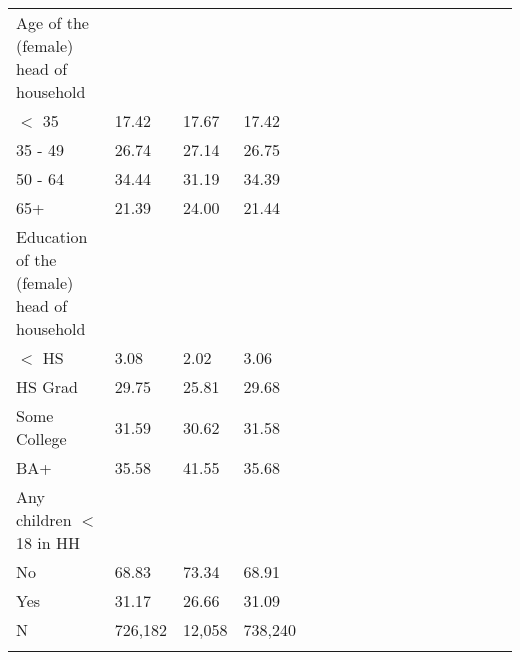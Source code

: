 \begin{center}
\begin{tabularx} {14cm} {@{} l Y Y Y Y Y Y Y Y Y Y Y Y Y Y Y Y@{}}
\midrule
Age of the (female) head of household&&& \\
$<$ 35&17.42&17.67&17.42 \\
35 - 49&26.74&27.14&26.75 \\
50 - 64&34.44&31.19&34.39 \\
65+&21.39&24.00&21.44 \\
\midrule
Education of the (female) head of household&&& \\
$<$ HS&3.08&2.02&3.06 \\
HS Grad&29.75&25.81&29.68 \\
Some College&31.59&30.62&31.58 \\
BA+&35.58&41.55&35.68 \\
\midrule
Any children $<$ 18 in HH&&& \\
No&68.83&73.34&68.91 \\
Yes&31.17&26.66&31.09 \\
\midrule
N&726,182&12,058&738,240 \\
\bottomrule
\addlinespace[.75ex]
\end{tabularx}
\par
\scriptsize{}
\normalsize
\end{center}
